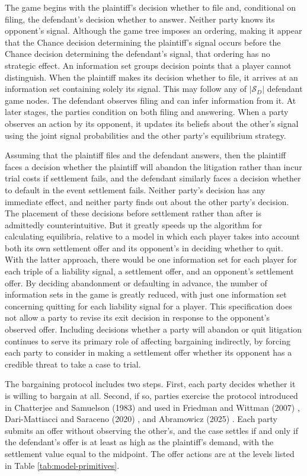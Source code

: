 \documentclass{article}
\begin{document}
The game begins with the plaintiff's decision whether to file and, conditional on filing, the defendant's decision whether to answer. Neither party knows its opponent's signal. Although the game tree imposes an ordering, making it appear that the Chance decision determining the plaintiff's signal occurs before the Chance decision determining the defendant's signal, that ordering has no strategic effect. An information set groups decision points that a player cannot distinguish. When the plaintiff makes its decision whether to file, it arrives at an information set containing solely its signal. This may follow any of $|\mathcal{S}_D|$ defendant game nodes. The defendant observes filing and can infer information from it. At later stages, the parties condition on both filing and answering. When a party observes an action by its opponent, it updates its beliefs about the other’s signal using the joint signal probabilities and the other party’s equilibrium strategy.

Assuming that the plaintiff files and the defendant answers, then the plaintiff faces a decision whether the plaintiff will abandon the litigation rather than incur trial costs if settlement fails, and the defendant similarly faces a decision whether to default in the event settlement fails. Neither party's decision has any immediate effect, and neither party finds out about the other party's decision. The placement of these decisions before settlement rather than after is admittedly counterintuitive. But it greatly speeds up the algorithm for calculating equilibria, relative to a model in which each player takes into account both its own settlement offer and its opponent's in deciding whether to quit. With the latter approach, there would be one information set for each player for each triple of a liability signal, a settlement offer, and an opponent's settlement offer. By deciding abandonment or defaulting in advance, the number of information sets in the game is greatly reduced, with just one information set concerning quitting for each liability signal for a player. This specification does not allow a party to revise its exit decision in response to the opponent's observed offer. Including decisions whether a party will abandon or quit litigation continues to serve its primary role of affecting bargaining indirectly, by forcing each party to consider in making a settlement offer whether its opponent has a credible threat to take a case to trial.

The bargaining protocol includes two steps. First, each party decides whether it is willing to bargain at all. Second, if so, parties exercise the protocol introduced in Chatterjee and Samuelson (1983) \cite{chatterjeesamuelson} and used in Friedman and Wittman (2007) \cite{friedmanwittman}, Dari-Mattiacci and Saraceno (2020) \cite{darimatiaccisaraceno}, and Abramowicz (2025) \cite{abramowicz}. Each party submits an offer without observing the other's, and the case settles if and only if the defendant's offer is at least as high as the plaintiff's demand, with the settlement value equal to the midpoint. The offer actions are at the levels listed in Table \ref{tab:model-primitives}.
\end{document}
